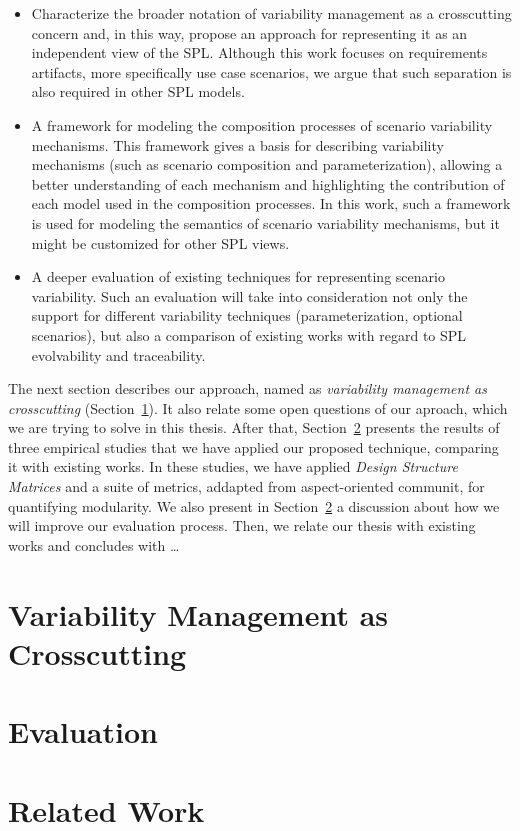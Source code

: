 \documentclass[times, 11pt,twocolumn]{article}
\begin{document}
\begin{itemize}
 \item Characterize the broader notation of variability management as
a crosscutting concern and, in this way, propose an approach for
representing it as an independent view of the SPL. Although
this work focuses on requirements artifacts, more specifically
use case scenarios, we argue that such separation is also required
in other SPL models.
 \item A framework for modeling the composition processes of scenario
variability mechanisms. This framework gives a basis for
describing variability mechanisms (such as scenario composition
and parameterization), allowing a better understanding of each mechanism and
highlighting the contribution of each model used in the composition processes.
In this work, such a framework is used for modeling the semantics of scenario variability mechanisms, but it
might be customized for other SPL views.
 \item A deeper evaluation of existing techniques for representing scenario
 variability. Such an evaluation will take into consideration not only the
 support for different variability techniques (parameterization, optional
 scenarios), but also a comparison of existing works with regard to
 SPL evolvability and traceability.  
\end{itemize}

The next section describes our approach, named as \emph{variability management
as crosscutting} (Section~\ref{sec:vmcc}). It also relate some open questions of our
aproach, which we are trying to solve in this thesis. After that,
Section~\ref{sec:evaluation} presents the results of three empirical studies
that we have applied our proposed technique, comparing it with existing works.
In these studies, we have applied \emph{Design Structure Matrices} and a suite
of metrics, addapted from aspect-oriented communit, for quantifying modularity.
We also present in Section~\ref{sec:evaluation} a discussion about how we will
improve our evaluation process. Then, we relate our thesis with existing works
and concludes with \ldots

\section{Variability Management as Crosscutting}\label{sec:vmcc}

\section{Evaluation}\label{sec:evaluation}

\section{Related Work}\label{sec:related}




\end{document}
